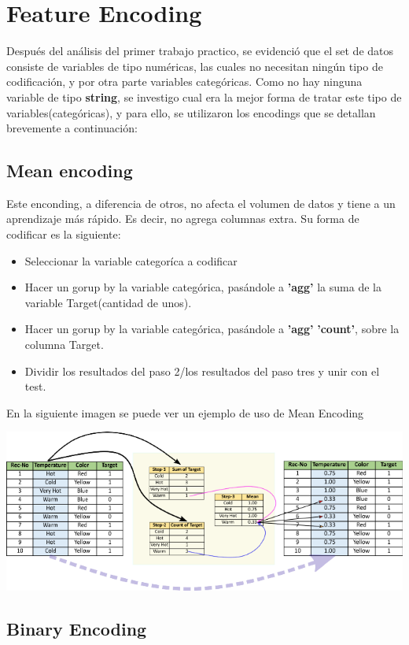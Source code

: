 \documentclass[12pt,a4paper]{article}
\begin{document}
\section{Feature Encoding}
Después del análisis del primer trabajo practico, se evidenció que el set de datos consiste de variables de tipo numéricas, las cuales no necesitan ningún tipo de codificación, y por otra parte variables categóricas. Como no hay ninguna variable de tipo \textbf{string}, se investigo cual era la mejor forma de tratar este tipo de variables(categóricas), y para ello, se utilizaron los encodings que se detallan brevemente a continuación:

\subsection{Mean encoding}
Este enconding, a diferencia de otros, no afecta el volumen de datos y tiene a un aprendizaje más rápido. Es decir, no agrega columnas extra. Su forma de codificar es la siguiente:
\begin{itemize}
    \item Seleccionar la variable categoríca a codificar
    \item Hacer un gorup by la variable categórica, pasándole a \textbf{'agg'} la suma de la variable Target(cantidad de unos).
    \item Hacer un gorup by la variable categórica, pasándole a \textbf{'agg'} \textbf{'count'}, sobre la columna Target.
    \item Dividir los resultados del paso 2/los resultados del paso tres y unir con el test.
\end{itemize}

En la siguiente imagen se puede ver un ejemplo de uso de Mean Encoding

\begin{center}
    \includegraphics[scale=0.5]{imgs/mean-encoding.png}
\end{center}


\subsection{Binary Encoding}
\end{document}
